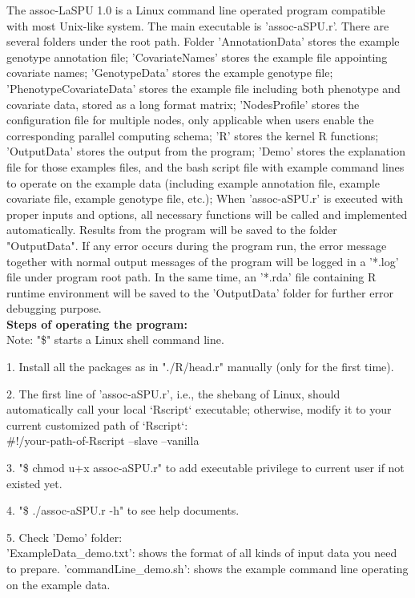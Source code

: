 \doublespace
The assoc-LaSPU 1.0 is a Linux command line operated program compatible with most Unix-like system. The main executable is 'assoc-aSPU.r'. There are several folders under the root path. Folder 'AnnotationData' stores the example genotype annotation file; 'CovariateNames' stores the example file appointing covariate names; 'GenotypeData' stores the example genotype file; 'PhenotypeCovariateData' stores the example file including both phenotype and covariate data, stored as a long format matrix; 'NodesProfile' stores the configuration file for multiple nodes, only applicable when users enable the corresponding parallel computing schema; 'R' stores the kernel R functions; 'OutputData' stores the output from the program; 'Demo' stores the explanation file for those examples files, and the bash script file with example command lines to operate on the example data (including example annotation file, example covariate file, example genotype file, etc.); When 'assoc-aSPU.r' is executed with proper inputs and options, all necessary functions will be called and implemented automatically. Results from the program will be saved to the folder "OutputData". If any error occurs during the program run, the error message together with normal output messages of the program will be logged in a '*.log' file under program root path. In the same time, an '*.rda' file containing R runtime environment will be saved to the 'OutputData' folder for further  error debugging purpose.\\

\textbf{Steps of operating the program:}\\
Note: "\$" starts a Linux shell command line.

1.	Install all the packages as in "./R/head.r" manually (only for the first time). 

2.	The first line of 'assoc-aSPU.r', i.e., the shebang of Linux, should automatically call your local `Rscript` executable; otherwise, modify it to your current customized path of `Rscript`:\\
\#!/your-path-of-Rscript --slave --vanilla

3.	"\$ chmod u+x assoc-aSPU.r"
to add executable privilege to current user if not existed yet.

4.	"\$ ./assoc-aSPU.r -h"
to see help documents.

5.	Check 'Demo' folder:\\
'ExampleData\_demo.txt': shows the format of all kinds of input data you need to prepare.
'commandLine\_demo.sh': shows the example command line operating on the example data.

